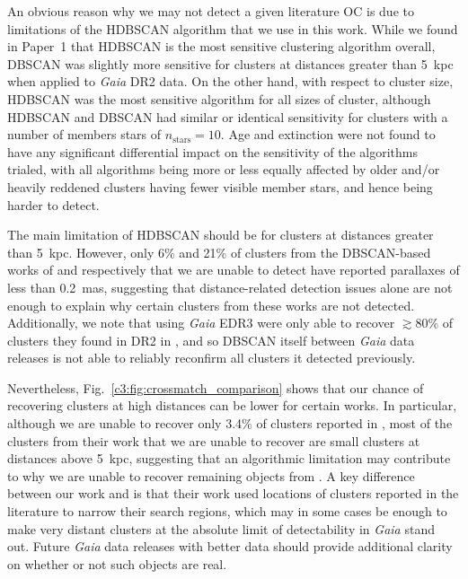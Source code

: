 An obvious reason why we may not detect a given literature OC is due to limitations of the HDBSCAN algorithm that we use in this work. While we found in Paper~1 that HDBSCAN is the most sensitive clustering algorithm overall, DBSCAN was slightly more sensitive for clusters at distances greater than 5~kpc when applied to \emph{Gaia} DR2 data. On the other hand, with respect to cluster size, HDBSCAN was the most sensitive algorithm for all sizes of cluster, although HDBSCAN and DBSCAN had similar or identical sensitivity for clusters with a number of members stars of $n_\text{stars}=10$. Age and extinction were not found to have any significant differential impact on the sensitivity of the algorithms trialed, with all algorithms being more or less equally affected by older and/or heavily reddened clusters having fewer visible member stars, and hence being harder to detect.

The main limitation of HDBSCAN should be for clusters at distances greater than 5~kpc. However, only 6\% and 21\% of clusters from the DBSCAN-based works of \cite{castro-ginard_hunting_2020} and \cite{castro-ginard_hunting_2022} respectively that we are unable to detect have reported parallaxes of less than 0.2~mas, suggesting that distance-related detection issues alone are not enough to explain why certain clusters from these works are not detected. Additionally, we note that \cite{castro-ginard_hunting_2022} using \emph{Gaia} EDR3 were only able to recover $\gtrsim$80\% of clusters they found in DR2 in \cite{castro-ginard_hunting_2020}, and so DBSCAN itself between \emph{Gaia} data releases is not able to reliably reconfirm all clusters it detected previously.

Nevertheless, Fig.~\ref{c3:fig:crossmatch_comparison} shows that our chance of recovering clusters at high distances can be lower for certain works. In particular, although we are unable to recover only 3.4\% of clusters reported in \cite{cantat-gaudin_clusters_2020}, most of the clusters from their work that we are unable to recover are small clusters at distances above 5~kpc, suggesting that an algorithmic limitation may contribute to why we are unable to recover remaining objects from \cite{cantat-gaudin_clusters_2020}. A key difference between our work and \cite{cantat-gaudin_clusters_2020} is that their work used locations of clusters reported in the literature to narrow their search regions, which may in some cases be enough to make very distant clusters at the absolute limit of detectability in \emph{Gaia} stand out. Future \emph{Gaia} data releases with better data should provide additional clarity on whether or not such objects are real.

